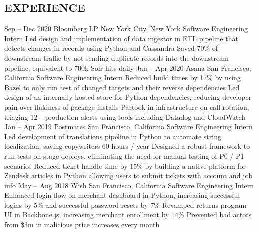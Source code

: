 \documentclass{aanguyen_res}
\begin{document}
  \begin{main}
    \vspace{0.2cm}%
    \section{EXPERIENCE}
      \begin{entrylist}
        \rightentry%
          {Sep -- Dec 2020}%
          {Bloomberg LP}%
          {New York City, New York}%
          {Software Engineering Intern}%
          {\createlist%
            {%
              Led design and implementation of data ingestor in ETL pipeline that detects changes in %
              records using Python and Cassandra %
            }%
            {%
              Saved 70\% of downstream traffic by not sending duplicate records into the downstream %
              pipeline, equivalent to 700k Solr hits daily%
            }%
          }
        \rightentry%
          {Jan -- Apr 2020}%
          {Asana}%
          {San Francisco, California}%
          {Software Engineering Intern}%
          {\createlist%
            {%
              Reduced build times by 17\%  by using Bazel to only run test of changed targets %
              and their reverse dependencies %
            }%
            {%
              Led design of an internally hosted store for Python dependencies, reducing developer %
              pain over flakiness of package installs %
            }%
            {%
              Partook in infrastructure on-call rotation, triaging 12+ production alerts using tools %
              including Datadog and CloudWatch %
            }%
          }
        \rightentry%
          {Jan -- Apr 2019}%
          {Postmates}%
          {San Francisco, California}%
          {Software Engineering Intern}%
          {\createlist%
            {%
              Led development of translations pipeline in Python to automate string localization, %
              saving copywriters 60 hours / year %
            }%
            {%
              Designed a robust framework to run tests on stage deploys, eliminating the need for %
              manual testing of P0 / P1 scenarios %
            }%
            {%
              Reduced ticket handle time by 15\% by building a native platform for Zendesk articles %
              in Python allowing users to submit tickets with account and job info %
            }%
          }
        \rightentry%
          {May -- Aug 2018}%
          {Wish}%
          {San Francisco, California}%
          {Software Engineering Intern}%
          {\createlist%
            {%
              Enhanced login flow on merchant dashboard in Python, increasing successful logins %
              by 5\% and successful password resets by 7\% %
            }%
            {%
              Revamped returns program UI in Backbone.js, increasing merchant enrollment %
              by 14\% %
            }%
            {%
              Prevented bad actors from \$3m in malicious price increases every month %
            }%
          }
      \end{entrylist}

\end{main}
\end{document}
